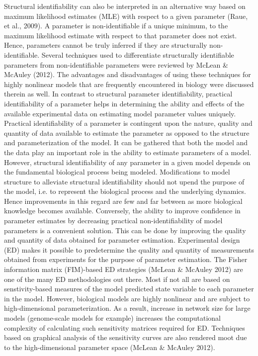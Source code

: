 \documentclass[10pt]{report}
\begin{document}
Structural identifiability can also be interpreted in an alternative way based on maximum likelihood estimates (MLE) with respect to a given parameter (Raue, et al., 2009). A parameter is non-identifiable if a unique minimum, to the maximum likelihood estimate with respect to that parameter does not exist. Hence, parameters cannot be truly inferred if they are structurally non-identifiable. Several techniques used to differentiate structurally identifiable parameters from non-identifiable parameters were reviewed by McLean \& McAuley (2012). The advantages and disadvantages of using these techniques for highly nonlinear models that are frequently encountered in biology were discussed therein as well.
In contrast to structural parameter identifiability, practical identifiability of a parameter helps in determining the ability and effects of the available experimental data on estimating model parameter values uniquely. Practical identifiability of a parameter is contingent upon the nature, quality and quantity of data available to estimate the parameter as opposed to the structure and parameterization of the model. It can be gathered that both the model and the data play an important role in the ability to estimate parameters of a model. However, structural identifiability of any parameter in a given model depends on the fundamental biological process being modeled. Modifications to model structure to alleviate structural identifiability should not upend the purpose of the model, i.e. to represent the biological process and the underlying dynamics. Hence improvements in this regard are few and far between as more biological knowledge becomes available. Conversely, the ability to improve confidence in parameter estimates by decreasing practical non-identifiability of model parameters is a convenient solution. 
This can be done by improving the quality and quantity of data obtained for parameter estimation. Experimental design (ED) makes it possible to predetermine the quality and quantity of measurements obtained from experiments for the purpose of parameter estimation. The Fisher information matrix (FIM)-based ED strategies (McLean \& McAuley 2012) are one of the many ED methodologies out there. Most if not all are based on senstivity-based measures of the model predicted state variable to each parameter in the model. However, biological models are highly nonlinear and are subject to high-dimensional parameterization. As a result, increase in network size for large models (genome-scale models for example) increases the computational complexity of calculating such sensitivity matrices required for ED. Techniques based on graphical analysis of the sensitivity curves are also rendered moot due to the high-dimensional parameter space (McLean \& McAuley 2012).
\end{document}
